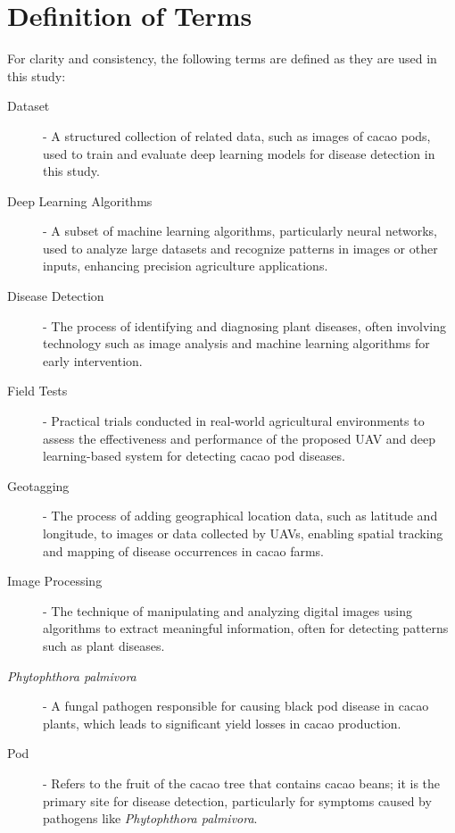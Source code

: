 {\section{Definition of Terms}

For clarity and consistency, the following terms are defined as they are used in this study:

\begin{description}
	\item[Dataset] - A structured collection of related data, such as images of cacao pods, used to train and evaluate deep learning models for disease detection in this study.
	
	\item[Deep Learning Algorithms] - A subset of machine learning algorithms, particularly neural networks, used to analyze large datasets and recognize patterns in images or other inputs, enhancing precision agriculture applications.
	
	\item[Disease Detection] - The process of identifying and diagnosing plant diseases, often involving technology such as image analysis and machine learning algorithms for early intervention.
	
	\item[Field Tests] - Practical trials conducted in real-world agricultural environments to assess the effectiveness and performance of the proposed UAV and deep learning-based system for detecting cacao pod diseases.
	
	\item[Geotagging] - The process of adding geographical location data, such as latitude and longitude, to images or data collected by UAVs, enabling spatial tracking and mapping of disease occurrences in cacao farms.
	
	\item[Image Processing] - The technique of manipulating and analyzing digital images using algorithms to extract meaningful information, often for detecting patterns such as plant diseases.
	
	\item[\textit{Phytophthora palmivora}] - A fungal pathogen responsible for causing black pod disease in cacao plants, which leads to significant yield losses in cacao production.
	
	\item[Pod] - Refers to the fruit of the cacao tree that contains cacao beans; it is the primary site for disease detection, particularly for symptoms caused by pathogens like \textit{Phytophthora palmivora}.
	

\end{description}}
